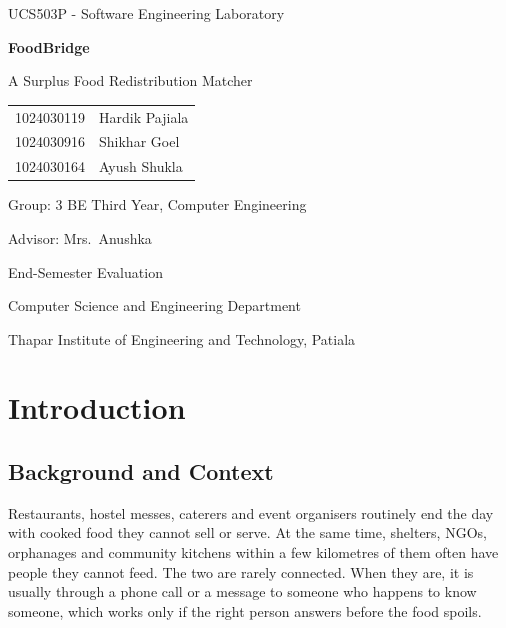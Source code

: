 \documentclass[11pt,a4paper]{report}
\begin{document}
\begin{titlepage}
\centering
{\large UCS503P - Software Engineering Laboratory\par}
\vspace{3cm}
{\Huge\bfseries FoodBridge\par}
\vspace{0.5cm}
{\Large A Surplus Food Redistribution Matcher\par}
\vspace{3cm}
\begin{tabular}{ll}
1024030119 & Hardik Pajiala \\
1024030916 & Shikhar Goel \\
1024030164 & Ayush Shukla \\
\end{tabular}
\par\vspace{1.2cm}
{\large Group: 3 \quad BE Third Year, Computer Engineering\par}
\vspace{0.4cm}
{\large Advisor: Mrs.\ Anushka\par}
\vfill
{\large End-Semester Evaluation\par}
\vspace{0.8cm}
{\large Computer Science and Engineering Department\par}
{\large Thapar Institute of Engineering and Technology, Patiala\par}
\end{titlepage}

\tableofcontents
\clearpage

\chapter{Introduction}

\section{Background and Context}

Restaurants, hostel messes, caterers and event organisers routinely end the day
with cooked food they cannot sell or serve. At the same time, shelters, NGOs,
orphanages and community kitchens within a few kilometres of them often have
people they cannot feed. The two are rarely connected. When they are, it is
usually through a phone call or a message to someone who happens to know
someone, which works only if the right person answers before the food spoils.
\end{document}
